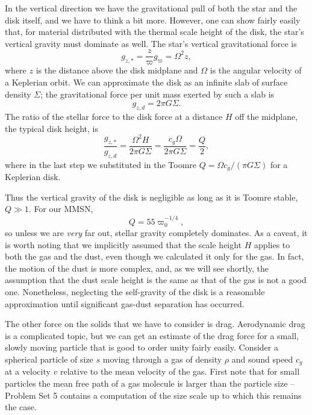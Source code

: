 In the vertical direction we have the gravitational pull of both the star and the disk itself, and we have to think a bit more. However, one can show fairly easily that, for material distributed with the thermal scale height of the disk, the star's vertical gravity must dominate as well. The star's vertical gravitational force is 
\begin{equation}
g_{z,*} = \frac{z}{\varpi} g_\varpi = \Omega^2 z,
\end{equation}
where $z$ is the distance above the disk midplane and $\Omega$ is the angular velocity of a Keplerian orbit. We can approximate the disk as an infinite slab of surface density $\Sigma$; the gravitational force per unit mass exerted by such a slab is
\begin{equation}
g_{z,d} = 2\pi G \Sigma.
\end{equation}
The ratio of the stellar force to the disk force at a distance $H$ off the midplane, the typical disk height, is
\begin{equation}
\frac{g_{z,*}}{g_{z,d}} = \frac{\Omega^2 H}{2\pi G \Sigma} = \frac{c_g \Omega}{2\pi G \Sigma} = \frac{Q}{2},
\end{equation}
where in the last step we substituted in the Toomre $Q=\Omega c_g/(\pi G \Sigma)$ for a Keplerian disk.

Thus the vertical gravity of the disk is negligible as long as it is Toomre stable, $Q\gg 1$. For our MMSN,
\begin{equation}
\label{eq:QMMSN}
Q=55 \varpi_0^{-1/4},
\end{equation}
so unless we are {\it very} far out, stellar gravity completely dominates. As a caveat, it is worth noting that we implicitly assumed that the scale height $H$ applies to both the gas and the dust, even though we calculated it only for the gas. In fact, the motion of the dust is more complex, and, as we will see shortly, the assumption that the dust scale height is the same as that of the gas is not a good one. Nonetheless, neglecting the self-gravity of the disk is a reasonable approximation until significant gas-dust separation has occurred.

The other force on the solids that we have to consider is drag. Aerodynamic drag is a complicated topic, but we can get an estimate of the drag force for a small, slowly moving particle that is good to order unity fairly easily. Consider a spherical particle of size $s$ moving through a gas of density $\rho$ and sound speed $c_g$ at a velocity $v$ relative to the mean velocity of the gas. First note that for small particles the mean free path of a gas molecule is larger than the particle size -- Problem Set 5 contains a computation of the size scale up to which this remains the case.

